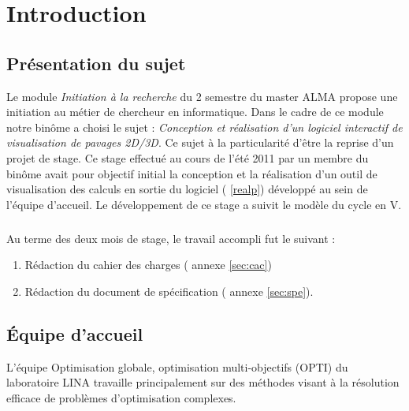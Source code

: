 \chapter{Introduction}

\section{Présentation du sujet}
Le module \emph{Initiation à la recherche} du 2 semestre du master \textsc{ALMA} propose une initiation au métier de chercheur en informatique. Dans le cadre de ce module notre binôme a choisi le sujet : \emph{Conception et réalisation d’un logiciel interactif de visualisation de pavages 2D/3D}. Ce sujet à la particularité d'être la reprise d'un projet de stage. Ce stage effectué au cours de l'été 2011 par un membre du binôme avait pour objectif initial la conception et la réalisation d'un outil de visualisation des calculs en sortie du logiciel \realpaver (\cf{} \ref{realp}) développé au sein de l'équipe d'accueil. Le développement de ce stage a suivit le modèle du cycle en V.

\paragraph{}
Au terme des deux mois de stage, le travail accompli fut le suivant :
\begin{enumerate}
\item 
Rédaction du cahier des charges (\cf{} annexe \ref{sec:cac})
\item
Rédaction du document de spécification (\cf{} annexe \ref{sec:spe}).
\end{enumerate} 



\section{\'Equipe d'accueil}
L'équipe Optimisation globale, optimisation multi-objectifs\cite{opti} (\textsc{OPTI}) du laboratoire \textsc{LINA}\cite{lina} travaille principalement sur des méthodes visant à la résolution efficace de problèmes d’optimisation complexes.  

